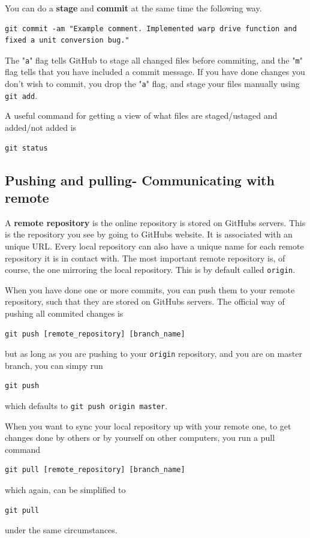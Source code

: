 \documentclass[12p,a4paper]{article}
\begin{document}
You can do a \textbf{stage} and \textbf{commit} at the same time the following way.
\begin{verbatim}
git commit -am "Example comment. Implemented warp drive function and fixed a unit conversion bug."
\end{verbatim}
The "\texttt{a}" flag tells GitHub to stage all changed files before commiting, and the "\texttt{m}" flag tells that you have included a commit message. If you have done changes you don't wish to commit, you drop the "\texttt{a}" flag, and stage your files manually using \texttt{git add}.

A useful command for getting a view of what files are staged/ustaged and added/not added is
\begin{verbatim}
git status
\end{verbatim}

\subsection{Pushing and pulling- Communicating with remote}
A \textbf{remote repository} is the online repository is stored on GitHubs servers. This is the repository you see by going to GitHubs website. It is associated with an unique URL. Every local repository can also have a unique name for each remote repository it is in contact with. The most important remote repository is, of course, the one mirroring the local repository. This is by default called \texttt{origin}.

When you have done one or more commits, you can push them to your remote repository, such that they are stored on GitHubs servers. The official way of pushing all commited changes is
\begin{verbatim}
git push [remote_repository] [branch_name]
\end{verbatim}
but as long as you are pushing to your \texttt{origin} repository, and you are on master branch, you can simpy run
\begin{verbatim}
git push
\end{verbatim}
which defaults to \texttt{git push origin master}.

When you want to sync your local repository up with your remote one, to get changes done by others or by yourself on other computers, you run a pull command
\begin{verbatim}
git pull [remote_repository] [branch_name]
\end{verbatim}
which again, can be simplified to
\begin{verbatim}
git pull
\end{verbatim}
under the same circumstances.
\end{document}
